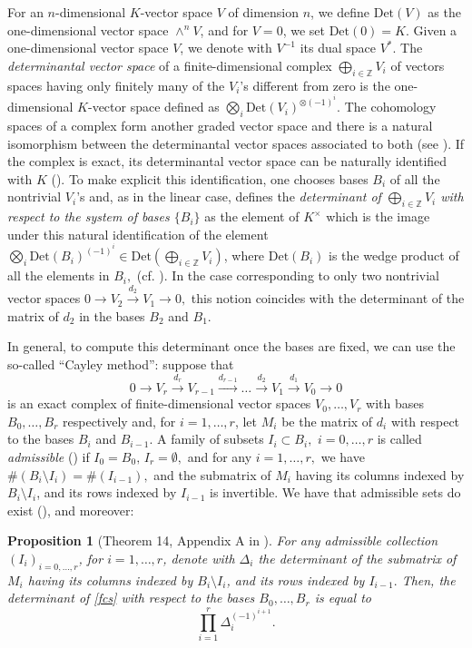 \documentclass[a4paper,11pt]{amsart}
\newcommand{\Z}{\mathbb{Z}}
\newcounter{thm}
\numberwithin{thm}{section}
\numberwithin{equation}{section}
\theoremstyle{definition}
\theoremstyle{plain}
\newtheorem{proposition}[thm]{Proposition}
\begin{document}
For an $n$-dimensional $K$-vector space $V$ of dimension $n$, we define $\mbox{Det}(V)$ as the one-dimensional vector space $\wedge^nV$, and for $V=0$, we set $\mbox{Det}(0)=K.$  Given a one-dimensional vector space $V$, we denote with $V^{-1}$ its dual space $V^*.$
The {\em determinantal vector space} of a finite-dimensional complex $\bigoplus_{i\in\Z} V_i$  of vectors spaces having only finitely many of the $V_i$'s  different from zero is the one-dimensional $K$-vector space defined as  $\bigotimes _i \mbox{Det}(V_i)^{\otimes (-1)^i}.$ The cohomology spaces of a complex form another graded vector space and there is a natural isomorphism between the determinantal vector spaces associated to both (see \cite[Proposition $3$, Appendix A]{GKZ94}).
If the complex is exact,  its determinantal vector space can be naturally identified with $K$ (\cite[Corollary $6$, Appendix A]{GKZ94}). To make explicit this identification, one chooses bases $B_i$ of all the nontrivial $V_i$'s and, as in the linear case, defines the {\em determinant of $\bigoplus_{i\in\Z} V_i$ with respect to the system of bases $\{B_i\}$}
as the element of $K^\times$ which is the image under this natural identification  of the element $\bigotimes_i \mbox{Det}(B_i)^{(-1)^i} \in \mbox{Det}(\bigoplus_{i\in\Z} V_i)$, where $\mbox{Det}(B_i)$ is the wedge product of all the elements in $B_i,$
 (cf. \cite[Definition $7$, Appendix A]{GKZ94}). In the case corresponding to only two nontrivial vector spaces $0\to V_2\stackrel{d_2}{\to} V_1\to0,$ this notion coincides with the determinant of the matrix of $d_2$ in the bases $B_2$ and $B_1.$

In general, to compute this determinant once the bases are fixed, we can use the so-called ``Cayley method'': suppose that
\begin{equation}\label{fcs}
0\to V_r\stackrel{d_r}{\to} V_{r-1}\stackrel{d_{r-1}}{\to}\ldots\stackrel{d_2}{\to} V_1\stackrel{d_1}{\to} V_0\to0
\end{equation}
is an exact complex of finite-dimensional vector spaces $V_0,\dots, V_r$ with bases $B_0,\ldots, B_r$ respectively and,  for $i=1,\dots, r$, let $M_i$ be the matrix of $d_i$ with respect to the bases $B_i$ and $B_{i-1}$.  A family of subsets $I_i\subset B_i,$ $i=0,\dots, r$ is called {\em admissible} (\cite[Definition $12$, Appendix A]{GKZ94}) if $I_0=B_0,\, I_r=\emptyset,$ and
for any $i=1,\ldots, r,$ we have $\#(B_{i}\setminus I_{i})=\#(I_{i-1}),$ and the submatrix of $M_i$ having its columns indexed by $B_{i}\setminus I_{i}$, and its rows indexed by $I_{i-1}$ is invertible. We have that admissible sets do exist (\cite[Proposition $13$, Appendix A]{GKZ94}), and moreover:
\begin{proposition}[Theorem 14, Appendix A in \cite{GKZ94}]\label{alt}
For any admissible collection $(I_i)_{i=0,\ldots, r}$, for $i=1,\dots, r$, denote with $\Delta_i$ the determinant of the submatrix of $M_{i}$ having its columns indexed by $B_{i}\setminus I_{i}$, and its rows indexed by $I_{i-1}.$ Then, the determinant of \eqref{fcs} with respect to the bases $B_0,\ldots, B_r$ is equal to
$$\prod_{i=1}^{r} \Delta_i^{(-1)^{i+1}}.
$$
\end{proposition}
\end{document}

